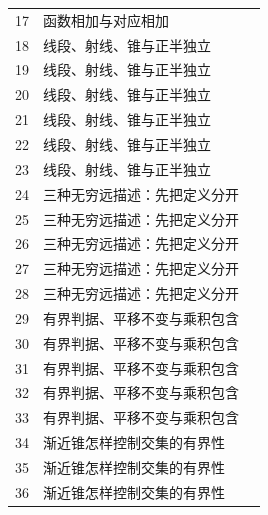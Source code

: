 \documentclass[11pt,a4paper]{article}
\theoremstyle{definition}\newtheorem{definition}{定义}\newtheorem{example}{例}
\begin{document}
\begin{longtable}{r p{.66\linewidth} r}
17 & 函数相加与对应相加 & \pageref{g:109:15}\\

18 & 线段、射线、锥与正半独立 & \pageref{g:109:18}\\

19 & 线段、射线、锥与正半独立 & \pageref{g:109:18}\\

20 & 线段、射线、锥与正半独立 & \pageref{g:109:18}\\

21 & 线段、射线、锥与正半独立 & \pageref{g:109:18}\\

22 & 线段、射线、锥与正半独立 & \pageref{g:109:18}\\

23 & 线段、射线、锥与正半独立 & \pageref{g:109:18}\\

24 & 三种无穷远描述：先把定义分开 & \pageref{g:109:24}\\

25 & 三种无穷远描述：先把定义分开 & \pageref{g:109:24}\\

26 & 三种无穷远描述：先把定义分开 & \pageref{g:109:24}\\

27 & 三种无穷远描述：先把定义分开 & \pageref{g:109:24}\\

28 & 三种无穷远描述：先把定义分开 & \pageref{g:109:24}\\

29 & 有界判据、平移不变与乘积包含 & \pageref{g:109:29}\\

30 & 有界判据、平移不变与乘积包含 & \pageref{g:109:29}\\

31 & 有界判据、平移不变与乘积包含 & \pageref{g:109:29}\\

32 & 有界判据、平移不变与乘积包含 & \pageref{g:109:29}\\

33 & 有界判据、平移不变与乘积包含 & \pageref{g:109:29}\\

34 & 渐近锥怎样控制交集的有界性 & \pageref{g:109:34}\\

35 & 渐近锥怎样控制交集的有界性 & \pageref{g:109:34}\\

36 & 渐近锥怎样控制交集的有界性 & \pageref{g:109:34}\\


\end{longtable}
\end{document}
